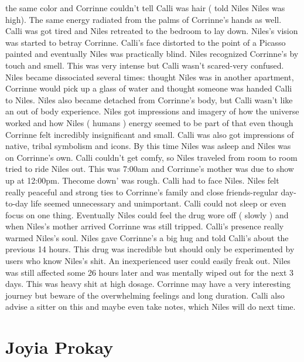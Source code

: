 \documentclass[12pt]{book}
\begin{document}
the same color and Corrinne couldn't tell Calli was hair ( told Niles Niles was high). The same energy radiated from the palms of Corrinne's hands as well. Calli was got tired and Niles retreated to the bedroom to lay down. Niles's vision was started to betray Corrinne. Calli's face distorted to the point of a Picasso painted and eventually Niles was practically blind. Niles recognized Corrinne's by touch and smell. This was very intense but Calli wasn't scared-very confused. Niles became dissociated several times: thought Niles was in another apartment, Corrinne would pick up a glass of water and thought someone was handed Calli to Niles. Niles also became detached from Corrinne's body, but Calli wasn't like an out of body experience. Niles got impressions and imagery of how the universe worked and how Niles ( humans ) energy seemed to be part of that even though Corrinne felt incredibly insignificant and small. Calli was also got impressions of native, tribal symbolism and icons. By this time Niles was asleep and Niles was on Corrinne's own. Calli couldn't get comfy, so Niles traveled from room to room tried to ride Niles out. This was 7:00am and Corrinne's mother was due to show up at 12:00pm. Thecome down' was rough. Calli had to face Niles. Niles felt really peaceful and strong ties to Corrinne's family and close friends-regular day-to-day life seemed unnecessary and unimportant. Calli could not sleep or even focus on one thing. Eventually Niles could feel the drug wore off ( slowly ) and when Niles's mother arrived Corrinne was still tripped. Calli's presence really warmed Niles's soul. Niles gave Corrinne's a big hug and told Calli's about the previous 14 hours. This drug was incredible but should only be experimented by users who know Niles's shit. An inexperienced user could easily freak out. Niles was still affected some 26 hours later and was mentally wiped out for the next 3 days. This was heavy shit at high dosage. Corrinne may have a very interesting journey but beware of the overwhelming feelings and long duration. Calli also advise a sitter on this and maybe even take notes, which Niles will do next time.



\chapter{Joyia Prokay}
\end{document}
